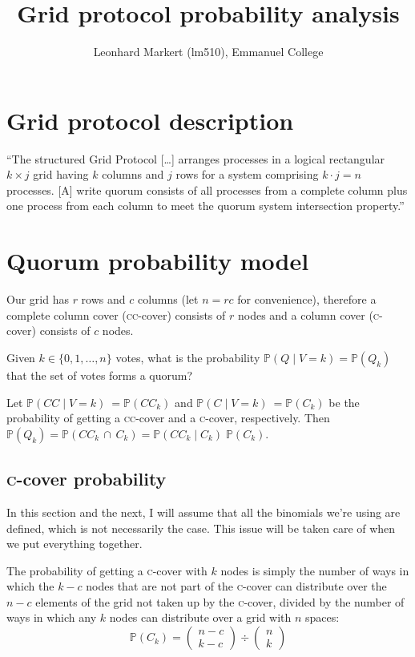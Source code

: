 \documentclass[10pt]{scrartcl}
\title{Grid protocol probability analysis}
\author{Leonhard Markert (lm510), Emmanuel College}
\begin{document}
\maketitle

\section{Grid protocol description%
  \label{grid-protocol-description}%
}

``The structured Grid Protocol [\dots] arranges processes in a logical rectangular \(k \times j\) grid having \(k\) columns and \(j\) rows for a system comprising \(k \cdot j = n\) processes. [A] write quorum consists of all processes from a complete column plus one process from each column to meet the quorum system intersection property.'' \cite{voting}

\section{Quorum probability model%
  \label{quorum-probability-model}%
}

Our grid has \(r\) rows and \(c\) columns (let \(n = r c\) for convenience), therefore a complete column cover (\textsc{cc}-cover) consists of \(r\) nodes and a column cover (\textsc{c}-cover) consists of \(c\) nodes.

Given \(k \in \{0, 1, \dots, n\}\) votes, what is the probability \(\mathbb{P}(Q\;|\;V=k) = \mathbb{P}(Q_k)\) that the set of votes forms a quorum?

Let \(\mathbb{P}(CC\;|\;V=k)\ = \mathbb{P}(CC_k)\) and \(\mathbb{P}(C\;|\;V=k)\ = \mathbb{P}(C_k)\) be the probability of getting a \textsc{cc}-cover and a \textsc{c}-cover, respectively. Then \(\mathbb{P}(Q_k) = \mathbb{P}(CC_k\,\cap\,C_k) = \mathbb{P}(CC_k\;|\;C_k)\;\mathbb{P}(C_k)\).

\subsection{\textsc{c}-cover probability}

In this section and the next, I will assume that all the binomials we're using are defined, which is not necessarily the case. This issue will be taken care of when we put everything together.

The probability of getting a \textsc{c}-cover with \(k\) nodes is simply the number of ways in which the \(k-c\) nodes that are not part of the \textsc{c}-cover can distribute over the \(n-c\) elements of the grid not taken up by the \textsc{c}-cover, divided by the number of ways in which any \(k\) nodes can distribute over a grid with \(n\) spaces: \[\mathbb{P}(C_k) = {\begin{pmatrix}n-c \\ k-c\end{pmatrix}} \div {\begin{pmatrix}n \\ k\end{pmatrix}}\]
\end{document}
